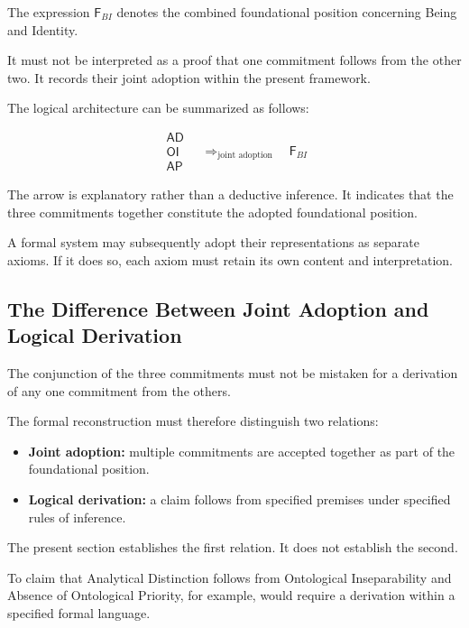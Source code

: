The expression \(\mathsf{F}_{BI}\) denotes
the combined foundational position concerning
Being and Identity.

It must not be interpreted as a proof
that one commitment follows from the other
two. It records their joint adoption
within the present framework.

The logical architecture can be summarized
as follows:

\[
\begin{array}{c}
\mathsf{AD}\\[4pt]
\mathsf{OI}\\[4pt]
\mathsf{AP}
\end{array}
\quad
\Longrightarrow_{\text{joint adoption}}
\quad
\mathsf{F}_{BI}
\]

The arrow is explanatory rather than
a deductive inference. It indicates
that the three commitments together
constitute the adopted foundational
position.

A formal system may subsequently adopt
their representations as separate axioms.
If it does so, each axiom must retain
its own content and interpretation.

\subsection{The Difference Between Joint Adoption and Logical Derivation}

The conjunction of the three commitments
must not be mistaken for a derivation
of any one commitment from the others.

The formal reconstruction must therefore
distinguish two relations:

\begin{itemize}
    \item \textbf{Joint adoption:} multiple
    commitments are accepted together
    as part of the foundational position.

    \item \textbf{Logical derivation:} a claim
    follows from specified premises under
    specified rules of inference.
\end{itemize}

The present section establishes the
first relation. It does not establish
the second.

To claim that Analytical Distinction
follows from Ontological Inseparability
and Absence of Ontological Priority,
for example, would require a derivation
within a specified formal language.

